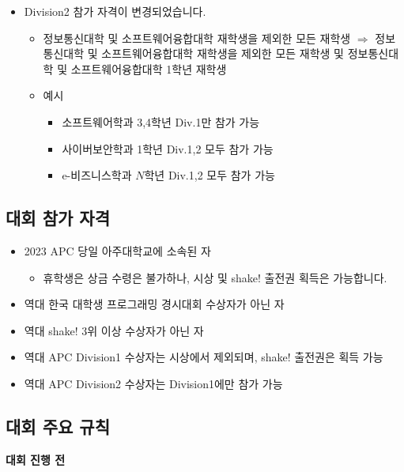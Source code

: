 \begin{spacing}{1.15}
\begin{itemize}
    \item Division2 참가 자격이 변경되었습니다.
    \begin{itemize}
        \item 정보통신대학 및 소프트웨어융합대학 재학생을 제외한 모든 재학생 $\Rightarrow$ 정보통신대학 및 소프트웨어융합대학 재학생을 제외한 모든 재학생 및 정보통신대학 및 소프트웨어융합대학 1학년 재학생
        \item 예시
        \begin{itemize}
            \item 소프트웨어학과 3,4학년\tabto{4cm} Div.1만 참가 가능
            \item 사이버보안학과 1학년 \tabto{4cm} Div.1,2 모두 참가 가능
            \item e-비즈니스학과 $N$학년 \tabto{4cm} Div.1,2 모두 참가 가능
        \end{itemize}
    \end{itemize}
\end{itemize}

\subsection*{대회 참가 자격}

\begin{itemize}
    \item 2023 APC 당일 아주대학교에 소속된 자
    \begin{itemize}
        \item 휴학생은 상금 수령은 불가하나, 시상 및 shake! 출전권 획득은 가능합니다.
    \end{itemize}
    \item 역대 한국 대학생 프로그래밍 경시대회 수상자가 아닌 자
    \item 역대 shake! 3위 이상 수상자가 아닌 자
    \item 역대 APC Division1 수상자는 시상에서 제외되며, shake! 출전권은 획득 가능
    \item 역대 APC Division2 수상자는 Division1에만 참가 가능
\end{itemize}


\subsection*{대회 주요 규칙}

\textbf{대회 진행 전}


\end{spacing}
